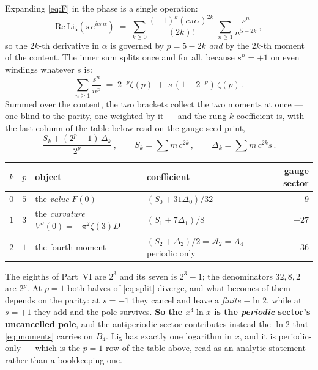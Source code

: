 \documentclass[11pt,a4paper]{article}
\begin{document}
Expanding \eqref{eq:F} in the phase is a single operation:
\begin{equation}\label{eq:expansion}
  \mathrm{Re}\,\mathrm{Li}_5\!\left(s\,e^{ic\pi\alpha}\right)
  \;=\;\sum_{k\ge0}\frac{(-1)^k (c\pi\alpha)^{2k}}{(2k)!}\;\sum_{n\ge1}\frac{s^n}{n^{5-2k}}\,,
\end{equation}
so the $2k$-th derivative in $\alpha$ is governed by $p=5-2k$ \emph{and} by the $2k$-th moment of the
content. The inner sum splits once and for all, because $s^n=+1$ on even windings whatever $s$ is:
\begin{equation}\label{eq:split}
  \sum_{n\ge1}\frac{s^n}{n^{p}}\;=\;2^{-p}\zeta(p)\;+\;s\,(1-2^{-p})\,\zeta(p)\,.
\end{equation}
Summed over the content, the two brackets collect the two moments at once --- one blind to the
parity, one weighted by it --- and the rung-$k$ coefficient is, with the last column of the table
below read on the gauge seed \cite{KM25} print,
\begin{equation}\label{eq:rung}
  \frac{S_k+(2^{p}-1)\,\Delta_k}{2^{p}}\,,\qquad
  S_k=\sum m\,c^{2k}\,,\qquad \Delta_k=\sum m\,c^{2k}s\,.
\end{equation}

\begin{center}\small
{}
\begin{tabular}{ccll r}
\toprule
\rowcolor{hdrblue!10}$k$ & $p$ & object & coefficient & gauge sector\\
\midrule
$0$ & $5$ & the \emph{value} $F(0)$ & $(S_0+31\Delta_0)/32$ & $9$\\
\rowcolor{amber!14}$1$ & $3$ & the \emph{curvature} $V''(0)=-\pi^2\zeta(3)D$ & $(S_1+7\Delta_1)/8$ & $-27$\\
$2$ & $1$ & the fourth moment & $(S_2+\Delta_2)/2=\mathcal{A}_2=A_4$ --- periodic only & $-36$\\
\bottomrule
\end{tabular}
\end{center}

\noindent The eighths of Part~VI are $2^3$ and its seven is $2^3-1$; the denominators $32,8,2$ are
$2^p$. At $p=1$ both halves of \eqref{eq:split} diverge, and what becomes of them depends on the
parity: at $s=-1$ they cancel and leave a \emph{finite} $-\ln2$, while at $s=+1$ they add and the
pole survives. \textbf{So the $x^4\ln x$ is the \emph{periodic} sector's uncancelled pole}, and the
antiperiodic sector contributes instead the $\ln2$ that \eqref{eq:moments} carries on $B_4$.
$\mathrm{Li}_5$ has exactly one logarithm in $x$, and it is periodic-only --- which is the $p=1$
row of the table above, read as an analytic statement rather than a bookkeeping one.
\end{document}
